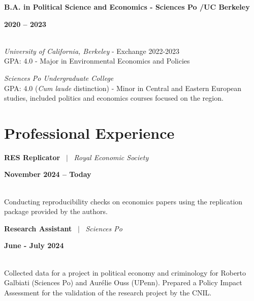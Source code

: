 \documentclass[a4paper,11pt]{article}
\begin{document}
\noindent
\begin{minipage}[t]{0.7\textwidth}
  \textbf{B.A. in Political Science and Economics - Sciences Po /UC Berkeley}
\end{minipage}%
\begin{minipage}[t]{0.3\textwidth}
  \raggedleft \textbf{2020 -- 2023}
\end{minipage}
\\
\textit{University of California, Berkeley} - Exchange 2022-2023 \\
GPA: 4.0  - Major in Environmental Economics and Policies

\textit{Sciences Po Undergraduate College}\\
GPA: 4.0 (\textit{Cum laude} distinction) - Minor in Central and Eastern European studies, included politics and economics courses focused on the region. 




\section{Professional Experience}

\noindent
\newline
\begin{minipage}[t]{0.7\textwidth}
  \textbf{RES Replicator} \ $|$ \ \textit{Royal Economic Society}
\end{minipage}%
\begin{minipage}[t]{0.3\textwidth}
  \raggedleft \textbf{November 2024 -- Today}
\end{minipage}
\\
Conducting reproducibility checks on economics papers using the replication package provided by the authors.

\noindent
\begin{minipage}[t]{0.7\textwidth}
  \textbf{Research Assistant} \ $|$ \ \textit{Sciences Po}
\end{minipage}%
\begin{minipage}[t]{0.3\textwidth}
  \raggedleft \textbf{June - July 2024}
\end{minipage}
\\
Collected data for a project in political economy and criminology for Roberto Galbiati (Sciences Po) and Aurélie Ouss (UPenn). Prepared a Policy Impact Assessment for the validation of the research project by the CNIL.
\end{document}
